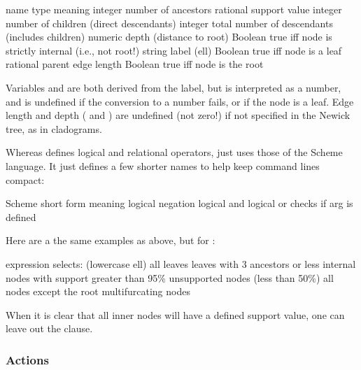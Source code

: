 \startalignment[center]
\starttabulate[|c|l|l|]
name \NC type \NC meaning \NC\NR
\HL
{} \NC integer \NC number of ancestors  \NC\NR
{} \NC rational \NC support value \NC\NR
{} \NC integer \NC number of children (direct descendants) \NC\NR
{} \NC integer \NC total number of descendants (includes children) \NC\NR
{} \NC numeric \NC depth (distance to root) \NC\NR
{} \NC Boolean \NC true iff node is strictly internal (i.e., not root!) \NC\NR
{} \NC string \NC label \NC\NR
{} (ell) \NC Boolean \NC true iff node is a leaf \NC\NR
{} \NC rational \NC parent edge length \NC\NR
{} \NC Boolean \NC true iff node is the root
\stoptabulate
\stopalignment

Variables  and  are both derived from the
label, but  is interpreted as a number, and is undefined if the
conversion to a number fails, or if the node is a leaf. Edge length and depth
( and ) are undefined (not zero!) if not specified in the
Newick tree, as in cladograms.

Whereas \ed{} defines logical and relational operators, \sched{} just uses those
of the Scheme language. It just defines a few shorter names to help keep command
lines compact:

\startalignment[center]
\starttabulate[|l|c|l|]
\NC Scheme \NC \sched{} short form \NC meaning \NC\NR
\HL
\NC {} 	\NC \code{!} 	\NC logical negation \NC\NR
\NC {} 	\NC \code{\&} 	\NC logical and \NC\NR
\NC {}  	\NC \code{\|} 	\NC logical or \NC\NR
\NC {} \NC {}	\NC checks if arg is defined  \NC\NR
\stoptabulate
\stopalignment

Here are a the same examples as above, but for \sched:

\startalignment[center]
\starttabulate[|c|l|]
expression \NC selects: \NC\NR
\HL
{} (lowercase ell) \NC all leaves \NC\NR
{} \NC leaves with 3 ancestors or less \NC\NR
{} \NC internal nodes with support greater than 95\% \NC\NR
{} \NC unsupported nodes (less than 50\%) \NC\NR
{} \NC all nodes except the root \NC\NR
{} \NC multifurcating nodes
\stoptabulate
\stopalignment

When it is clear that all inner nodes will have a defined support
value, one can leave out the  clause.

\subsubsection{Actions}

